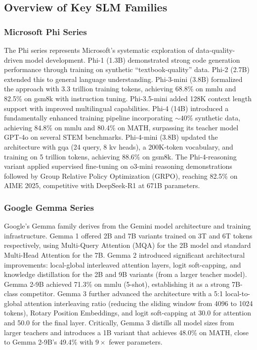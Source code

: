 \subsection{Overview of Key SLM Families}
\label{subsec:background_families}

\subsubsection{Microsoft Phi Series}
\label{subsubsec:phi_series}
The Phi series represents Microsoft's systematic exploration of data-quality-driven model development. Phi-1 (1.3B) \citep{gunasekar2023phi1} demonstrated strong code generation performance through training on synthetic ``textbook-quality'' data. Phi-2 (2.7B) \citep{microsoft2023phi2} extended this to general language understanding. Phi-3-mini (3.8B) \citep{abdin2024phi3} formalized the approach with 3.3 trillion training tokens, achieving 68.8\% on \gls{mmlu} and 82.5\% on \gls{gsm8k} with instruction tuning. Phi-3.5-mini \citep{abdin2024phi35} added 128K context length support with improved multilingual capabilities. Phi-4 (14B) \citep{abdin2024phi4} introduced a fundamentally enhanced training pipeline incorporating ${\sim}40\%$ synthetic data, achieving 84.8\% on \gls{mmlu} and 80.4\% on MATH, surpassing its teacher model GPT-4o on several STEM benchmarks. Phi-4-mini (3.8B) \citep{microsoft2025phi4mini} updated the architecture with \gls{gqa} (24 query, 8 \gls{kv} heads), a 200K-token vocabulary, and training on 5 trillion tokens, achieving 88.6\% on \gls{gsm8k}. The Phi-4-reasoning variant \citep{abdin2025phi4reasoning} applied supervised fine-tuning on o3-mini reasoning demonstrations followed by Group Relative Policy Optimization (GRPO), reaching 82.5\% on AIME 2025, competitive with DeepSeek-R1 at 671B parameters.

\subsubsection{Google Gemma Series}
\label{subsubsec:gemma_series}
Google's Gemma family \citep{gemma2024} derives from the Gemini model architecture and training infrastructure. Gemma 1 offered 2B and 7B variants trained on 3T and 6T tokens respectively, using Multi-Query Attention (MQA) for the 2B model and standard Multi-Head Attention for the 7B. Gemma 2 \citep{gemma2team2024} introduced significant architectural improvements: local-global interleaved attention layers, logit soft-capping, and knowledge distillation for the 2B and 9B variants (from a larger teacher model). Gemma 2-9B achieved 71.3\% on \gls{mmlu} (5-shot), establishing it as a strong 7B-class competitor. Gemma 3 \citep{team2025gemma3} further advanced the architecture with a 5:1 local-to-global attention interleaving ratio (reducing the sliding window from 4096 to 1024 tokens), Rotary Position Embeddings, and logit soft-capping at 30.0 for attention and 50.0 for the final layer. Critically, Gemma 3 distills all model sizes from larger teachers and introduces a 1B variant that achieves 48.0\% on MATH, close to Gemma 2-9B's 49.4\% with $9\times$ fewer parameters.

